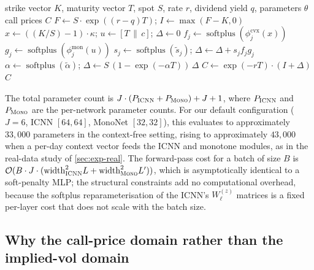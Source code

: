 \documentclass[largeformat]{interact}
\theoremstyle{plain}
\theoremstyle{definition}
\DeclareMathOperator{\softplus}{softplus}
\newcommand{\arbnet}{\textsc{ArbNet}}
\newcommand{\icnn}{\textsc{ICNN}}
\newcommand{\mononet}{\textsc{Mono}}
\begin{document}
\begin{algorithm}[t]
\caption{\arbnet{} forward pass}
\label{alg:forward}
\begin{algorithmic}[1]
\Require strike vector $K$, maturity vector $T$, spot $S$, rate $r$, dividend yield $q$, parameters $\theta$
\Ensure call prices $C$
\State $F \gets S \cdot \exp((r-q) T)$; \quad $I \gets \max(F - K, 0)$
\State $x \gets ((K/S) - 1)\cdot \kappa$; \quad $u \gets [T \,\|\, c]$; \quad $\Delta \gets 0$
   \State $f_j \gets \softplus(\phi^{\mathrm{cvx}}_j(x))$ 
   \State $g_j \gets \softplus(\phi^{\mathrm{mon}}_j(u))$ 
   \State $s_j \gets \softplus(\widetilde s_j)$; \quad $\Delta \gets \Delta + s_j f_j g_j$
\EndFor
\State $\alpha \gets \softplus(\widetilde\alpha)$; \quad $\Delta \gets S\,(1-\exp(-\alpha T))\,\Delta$
\State $C \gets \exp(-rT)\cdot(I + \Delta)$ \Return $C$
\end{algorithmic}
\end{algorithm}

The total parameter count is $J \cdot (P_{\icnn} + P_{\mononet}) + J + 1$, where $P_{\icnn}$ and $P_{\mononet}$ are the per-network parameter counts. For our default configuration ($J = 6$, ICNN $[64, 64]$, MonoNet $[32, 32]$), this evaluates to approximately $33{,}000$ parameters in the context-free setting, rising to approximately $43{,}000$ when a per-day context vector feeds the ICNN and monotone modules, as in the real-data study of \cref{sec:exp-real}. The forward-pass cost for a batch of size $B$ is $\mathcal{O}(B \cdot J \cdot (\mathrm{width}_{\icnn}^2 L + \mathrm{width}_{\mononet}^2 L'))$, which is asymptotically identical to a soft-penalty MLP; the structural constraints add no computational overhead, because the softplus reparameterisation of the ICNN's $W^{(z)}_\ell$ matrices is a fixed per-layer cost that does not scale with the batch size.

\subsection{Why the call-price domain rather than the implied-vol domain}
\label{sec:why-call-domain}
\end{document}
